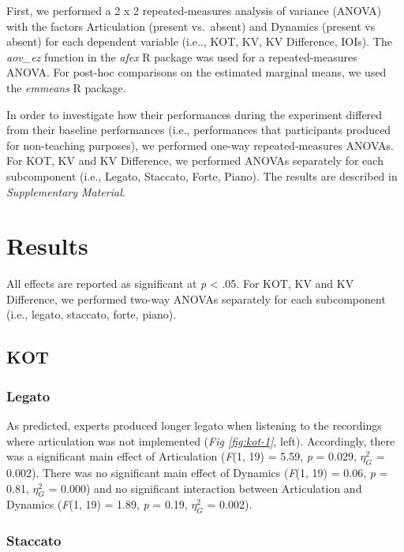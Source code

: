 \documentclass[
  man,floatsintext]{apa6}
\begin{document}
First, we performed a 2 x 2 repeated-measures analysis of variance (ANOVA) with the factors Articulation (present vs.~absent) and Dynamics (present vs absent) for each dependent variable (i.e.., KOT, KV, KV Difference, IOIs). The \emph{aov\_ez} function in the \emph{afex} R package was used for a repeated-measures ANOVA. For post-hoc comparisons on the estimated marginal means, we used the \emph{emmeans} R package.

In order to investigate how their performances during the experiment differed from their baseline performances (i.e., performances that participants produced for non-teaching purposes), we performed one-way repeated-measures ANOVAs. For KOT, KV and KV Difference, we performed ANOVAs separately for each subcomponent (i.e., Legato, Staccato, Forte, Piano). The results are described in \emph{Supplementary Material}.

\hypertarget{results}{%
\section{Results}\label{results}}

All effects are reported as significant at \emph{p} \textless{} .05. For KOT, KV and KV Difference, we performed two-way ANOVAs separately for each subcomponent (i.e., legato, staccato, forte, piano).

\hypertarget{kot}{%
\subsection{KOT}\label{kot}}

\hypertarget{legato}{%
\subsubsection{Legato}\label{legato}}

As predicted, experts produced longer legato when listening to the recordings where articulation was not implemented (\emph{Fig \ref{fig:kot-1}}, left). Accordingly, there was a significant main effect of Articulation (\emph{F}(1, 19) = 5.59, \emph{p} = 0.029, \(\eta_G^2\) = 0.002). There was no significant main effect of Dynamics (\emph{F}(1, 19) = 0.06, \emph{p} = 0.81, \(\eta_G^2\) = 0.000) and no significant interaction between Articulation and Dynamics (\emph{F}(1, 19) = 1.89, \emph{p} = 0.19, \(\eta_G^2\) = 0.002).

\hypertarget{staccato}{%
\subsubsection{Staccato}\label{staccato}}
\end{document}
